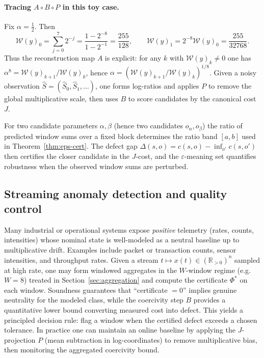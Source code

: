 \documentclass[11pt,reqno]{amsart}
\theoremstyle{definition}
\theoremstyle{remark}
\newcommand{\Rp}{\mathbb{R}_{>0}}
\newcommand{\1}{\mathbf{1}}
\newcommand{\eps}{\varepsilon}
\begin{document}
\paragraph{Tracing $A\circ B\circ P$ in this toy case.}
Fix $\alpha=\tfrac12$. Then
\[
\mathcal W(y)_0=\sum_{j=0}^7 2^{-j}=\frac{1-2^{-8}}{1-2^{-1}}=\frac{255}{128},
\qquad
\mathcal W(y)_1=2^{-8}\mathcal W(y)_0=\frac{255}{32768}.
\]
Thus the reconstruction map $A$ is explicit: for any $k$ with $\mathcal W(y)_k\neq 0$ one has
$\alpha^8=\mathcal W(y)_{k+1}/\mathcal W(y)_k$, hence $\alpha=(\mathcal W(y)_{k+1}/\mathcal W(y)_k)^{1/8}$.
Given a noisy observation $\widehat S=(\widehat S_0,\widehat S_1,\dots)$, one forms log-ratios and applies
$P$ to remove the global multiplicative scale, then uses $B$ to score candidates by the canonical cost $J$.

For two candidate parameters $\alpha,\beta$ (hence two candidates $o_\alpha,o_\beta$) the ratio of predicted window sums
over a fixed block determines the ratio band $[a,b]$ used in Theorem~\ref{thm:eps-cert}. The defect gap
$\Delta(s,o)=c(s,o)-\inf_{o'}c(s,o')$ then certifies the closer candidate in the $J$-cost, and the $\eps$-meaning set
quantifies robustness when the observed window sums are perturbed.

\subsection{Streaming anomaly detection and quality control}
Many industrial or operational systems expose \emph{positive} telemetry (rates, counts, intensities)
whose nominal state is well-modeled as a neutral baseline up to multiplicative drift.
Examples include packet or transaction counts, sensor intensities, and throughput rates.
Given a stream $t\mapsto x(t)\in(\Rp)^n$ sampled at high rate, one may form windowed aggregates
in the $W$-window regime (e.g. $W=8$) treated in Section~\ref{sec:aggregation} and compute the certificate $\Phi^\ast$
on each window.
Soundness guarantees that ``certificate $=0$'' implies genuine neutrality for the modeled class,
while the coercivity step $B$ provides a quantitative lower bound converting measured cost into defect.
This yields a principled decision rule: flag a window when the certified defect exceeds a chosen tolerance.
In practice one can maintain an online baseline by applying the $J$-projection $P$ (mean subtraction in log-coordinates)
to remove multiplicative bias, then monitoring the aggregated coercivity bound.
\end{document}
